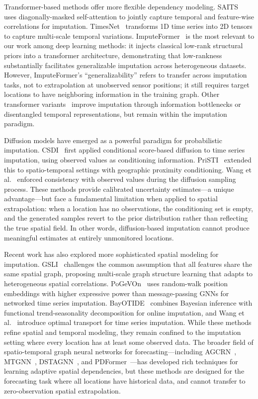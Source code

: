 \documentclass[journal]{IEEEtran}
\begin{document}
Transformer-based methods offer more flexible dependency modeling. SAITS~\cite{du2023saits} uses diagonally-masked self-attention to jointly capture temporal and feature-wise correlations for imputation. TimesNet~\cite{wu2023timesnet} transforms 1D time series into 2D tensors to capture multi-scale temporal variations. ImputeFormer~\cite{nie2024imputeformer} is the most relevant to our work among deep learning methods: it injects classical low-rank structural priors into a transformer architecture, demonstrating that low-rankness substantially facilitates generalizable imputation across heterogeneous datasets. However, ImputeFormer's ``generalizability'' refers to transfer across imputation tasks, not to extrapolation at unobserved sensor positions; it still requires target locations to have neighboring information in the training graph. Other transformer variants~\cite{choi2024cib,liu2023disentangled} improve imputation through information bottlenecks or disentangled temporal representations, but remain within the imputation paradigm.

Diffusion models have emerged as a powerful paradigm for probabilistic imputation. CSDI~\cite{tashiro2021csdi} first applied conditional score-based diffusion to time series imputation, using observed values as conditioning information. PriSTI~\cite{choi2023pristi} extended this to spatio-temporal settings with geographic proximity conditioning. Wang et al.~\cite{wang2023observed} enforced consistency with observed values during the diffusion sampling process. These methods provide calibrated uncertainty estimates---a unique advantage---but face a fundamental limitation when applied to spatial extrapolation: when a location has no observations, the conditioning set is empty, and the generated samples revert to the prior distribution rather than reflecting the true spatial field. In other words, diffusion-based imputation cannot produce meaningful estimates at entirely unmonitored locations.

Recent work has also explored more sophisticated spatial modeling for imputation. GSLI~\cite{yang2025gsli} challenges the common assumption that all features share the same spatial graph, proposing multi-scale graph structure learning that adapts to heterogeneous spatial correlations. PoGeVOn~\cite{wang2023pogevo} uses random-walk position embeddings with higher expressive power than message-passing GNNs for networked time series imputation. BayOTIDE~\cite{fang2024bayotide} combines Bayesian inference with functional trend-seasonality decomposition for online imputation, and Wang et al.~\cite{wang2025ot} introduce optimal transport for time series imputation. While these methods refine spatial and temporal modeling, they remain confined to the imputation setting where every location has at least some observed data. The broader field of spatio-temporal graph neural networks for forecasting---including AGCRN~\cite{bai2020agcrn}, MTGNN~\cite{wu2020mtgnn}, DSTAGNN~\cite{lan2022dstagnn}, and PDFormer~\cite{jiang2023pdformer}---has developed rich techniques for learning adaptive spatial dependencies, but these methods are designed for the forecasting task where all locations have historical data, and cannot transfer to zero-observation spatial extrapolation.
\end{document}
